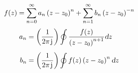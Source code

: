 \begin{mdframed}[style=PropertyFrame]
    \begin{prop}
    \end{prop}
    \begin{equation*}
        f(z) = \sum_{n=0}^\infty a_n \left(z-z_0\right)^n + \sum_{n=1}^\infty b_n \left(z-z_0\right)^{-n}
    \end{equation*}
    \begin{align*}
        a_n &= \left( \frac{1}{2\pi \mkern2mu\mathrm{j}\mkern1mu} \right) \displaystyle\oint \frac{f(z)}{\left(z-z_0\right)^{n+1}} \textsl{d} z
        \\[1ex]
        b_n &= \left( \frac{1}{2\pi \mkern2mu\mathrm{j}\mkern1mu} \right) \displaystyle\oint f(z) \left(z-z_0\right)^n \textsl{d} z
    \end{align*}
\end{mdframed}